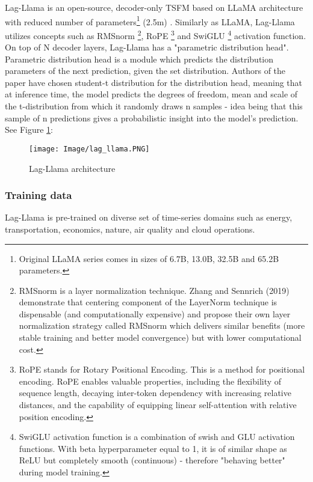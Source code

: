 Lag-Llama is an open-source, decoder-only TSFM based on LLaMA \cite{touvron2023llama} architecture with reduced number of parameters\footnote{ Original LLaMA series comes in sizes of 6.7B, 13.0B, 32.5B and 65.2B parameters.} (2.5m) . Similarly as LLaMA, Lag-Llama utilizes concepts such as RMSnorm \cite{zhang2019root}\footnote{RMSnorm is a layer normalization technique. Zhang and Sennrich (2019) demonstrate that centering component of the LayerNorm technique is dispensable (and computationally expensive) and propose their own layer normalization strategy called RMSnorm which delivers similar benefits (more stable training and better model convergence) but with lower computational cost.}, RoPE \cite{su2024roformer}\footnote{RoPE stands for Rotary Positional Encoding. This is a method for positional encoding. RoPE enables valuable properties, including the flexibility of sequence length,
decaying inter-token dependency with increasing relative distances, and the capability of equipping linear self-attention with relative position encoding.} and SwiGLU \cite{shazeer2020glu}\footnote{SwiGLU activation function is a combination of swish and GLU activation functions. With beta hyperparameter equal to 1, it is of similar shape as ReLU but completely smooth (continuous) - therefore "behaving better" during model training.} activation function\cite{miller2024survey}. On top of N decoder layers, Lag-Llama has a "parametric distribution head". Parametric distribution head is a module which predicts the distribution parameters of the next prediction, given the set distribution. Authors of the paper have chosen student-t distribution for the distribution head, meaning that at inference time, the model predicts the degrees of freedom, mean and scale \cite{student1908probable} of the t-distribution from which it randomly draws n samples - idea being that this sample of n predictions gives a probabilistic insight into the model's prediction. See Figure \ref{fig:lagllama}:

\begin{figure}[h]
\centering
\texttt{[image: Image/lag\_llama.PNG]}
\caption{Lag-Llama architecture \cite{rasul2023lag}}
\label{fig:lagllama}
\end{figure}

\subsubsection{Training data}

Lag-Llama is pre-trained on diverse set of time-series domains such as energy, transportation, economics, nature, air quality and cloud operations.